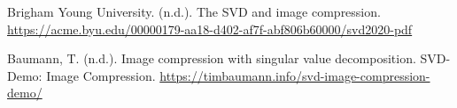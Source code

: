 \documentclass{article}
\begin{document}
\begin{thebibliography}{}

    Brigham Young University. (n.d.). The SVD and image compression. \url{https://acme.byu.edu/00000179-aa18-d402-af7f-abf806b60000/svd2020-pdf}

    Baumann, T. (n.d.). Image compression with singular value decomposition. SVD-Demo: Image Compression. \url{https://timbaumann.info/svd-image-compression-demo/}

\end{thebibliography}
\end{document}

